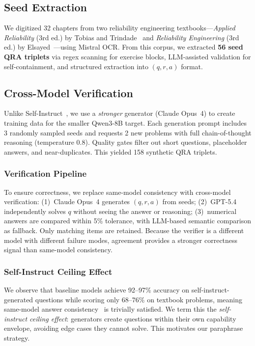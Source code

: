 \subsection{Seed Extraction}
\label{sec:data:seed}

We digitized 32 chapters from two reliability engineering textbooks---\emph{Applied Reliability} (3rd ed.) by Tobias and Trindade~\cite{tobias2012applied} and \emph{Reliability Engineering} (3rd ed.) by Elsayed~\cite{elsayed2012reliability}---using Mistral OCR. From this corpus, we extracted \textbf{56 seed QRA triplets} via regex scanning for exercise blocks, LLM-assisted validation for self-containment, and structured extraction into $(q, r, a)$ format.

\subsection{Cross-Model Verification}
\label{sec:data:selfinst}

Unlike Self-Instruct~\cite{wang2023selfinstruct}, we use a \emph{stronger} generator (Claude Opus~4) to create training data for the smaller Qwen3-8B target. Each generation prompt includes 3 randomly sampled seeds and requests 2 new problems with full chain-of-thought reasoning (temperature 0.8). Quality gates filter out short questions, placeholder answers, and near-duplicates. This yielded 158 synthetic QRA triplets.

\subsubsection{Verification Pipeline}
\label{sec:data:verification}

To ensure correctness, we replace same-model consistency with cross-model verification: (1)~Claude Opus~4 generates $(q,r,a)$ from seeds; (2)~GPT-5.4 independently solves $q$ without seeing the answer or reasoning; (3)~numerical answers are compared within 5\% tolerance, with LLM-based semantic comparison as fallback. Only matching items are retained. Because the verifier is a different model with different failure modes, agreement provides a stronger correctness signal than same-model consistency.

\subsubsection{Self-Instruct Ceiling Effect}

We observe that baseline models achieve 92--97\% accuracy on self-instruct-generated questions while scoring only 68--76\% on textbook problems, meaning same-model answer consistency~\cite{wang2023selfinstruct} is trivially satisfied. We term this the \emph{self-instruct ceiling effect}: generators create questions within their own capability envelope, avoiding edge cases they cannot solve. This motivates our paraphrase strategy.

